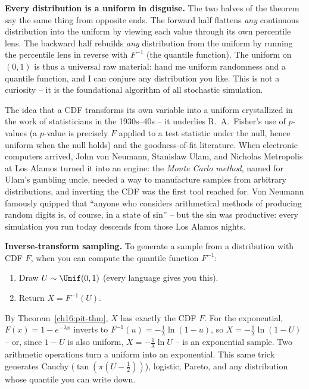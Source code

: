 \begin{happeningbox}
\textbf{Every distribution is a uniform in disguise.} The two halves of the theorem say
the same thing from opposite ends. The forward half flattens \emph{any} continuous
distribution into the uniform by viewing each value through its own percentile lens. The
backward half rebuilds \emph{any} distribution from the uniform by running the percentile
lens in reverse with $F^{-1}$ (the quantile function). The uniform on $(0,1)$ is thus a
universal raw material: hand me uniform randomness and a quantile function, and I can
conjure any distribution you like. This is not a curiosity -- it is the foundational
algorithm of all stochastic simulation.
\end{happeningbox}

\begin{historybox}
The idea that a CDF transforms its own variable into a uniform crystallized in the work of
statisticians in the 1930s--40s -- it underlies R.~A.\ Fisher's use of $p$-values (a
$p$-value is precisely $F$ applied to a test statistic under the null, hence uniform when
the null holds) and the goodness-of-fit literature. When electronic computers arrived,
John von Neumann, Stanislaw Ulam, and Nicholas Metropolis at Los Alamos turned it into an
engine: the \emph{Monte Carlo method}, named for Ulam's gambling uncle, needed a way to
manufacture samples from arbitrary distributions, and inverting the CDF was the first tool
reached for. Von Neumann famously quipped that ``anyone who considers arithmetical methods
of producing random digits is, of course, in a state of sin'' -- but the sin was
productive: every simulation you run today descends from those Los Alamos nights.
\end{historybox}

\begin{applicationbox}
\textbf{Inverse-transform sampling.} To generate a sample from a distribution with CDF $F$,
when you can compute the quantile function $F^{-1}$:
\begin{enumerate}
  \item Draw $U \sim \Unif(0,1)$ (every language gives you this).
  \item Return $X = F^{-1}(U)$.
\end{enumerate}
By Theorem~\ref{ch16:pit-thm}, $X$ has exactly the CDF $F$. For the exponential, $F(x) =
1 - e^{-\lambda x}$ inverts to $F^{-1}(u) = -\tfrac{1}{\lambda}\ln(1-u)$, so
$X = -\tfrac{1}{\lambda}\ln(1-U)$ -- or, since $1-U$ is also uniform,
$X = -\tfrac{1}{\lambda}\ln U$ -- is an exponential sample. Two arithmetic operations turn
a uniform into an exponential. This same trick generates Cauchy ($\tan(\pi(U-\tfrac12))$),
logistic, Pareto, and any distribution whose quantile you can write down.
\end{applicationbox}

